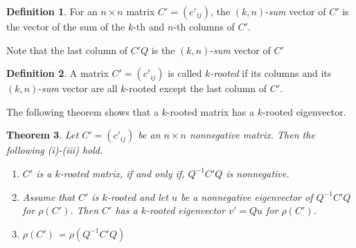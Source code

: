 \documentclass[12pt]{report}%
\theoremstyle{plain}
\newtheorem{thm}{Theorem}[chapter]
\theoremstyle{definition}
\newtheorem{defn}[thm]{Definition}
\begin{document}
\begin{defn}
For an $n \times n$ matrix $C'=(c'_{ij})$, the $(k, n)$-{\it sum} vector of $C'$ is the vector of the sum of the $k$-th and  $n$-th columns of $C'$.
\end{defn}

Note that the last column of $C'Q$ is the $(k, n)$-{\it sum} vector of $C'$

\begin{defn}\label{m_rooted}
A  matrix $C'=(c'_{ij})$ is called {\it $k$-rooted}  if its  columns and its $(k, n)$-{\it sum} vector are all $k$-rooted except the last column of $C'$.
\end{defn}

The following theorem shows that a $k$-rooted matrix has a $k$-rooted eigenvector. 

\begin{thm} \label{lma_m_rooted}
Let $C'=(c'_{ij})$ be an $n\times n$ nonnegative matrix. Then the following (i)-(iii) hold.
    \begin{enumerate}
        \item[(i)]$C'$ is a $k$-rooted matrix, if and only if, $Q^{-1}C'Q$ is nonnegative.
        \item[(ii)]Assume that $C'$ is $k$-rooted and let $u$ be a nonnegative eigenvector of $Q^{-1}C'Q$ for $\rho(C')$. Then  $C'$ has a $k$-rooted eigenvector $v'=Qu$ for $\rho(C')$. 
        \item[(iii)] $\rho(C')$ = $\rho(Q^{-1}C'Q)$
    \end{enumerate}
\end{thm}
\end{document}
